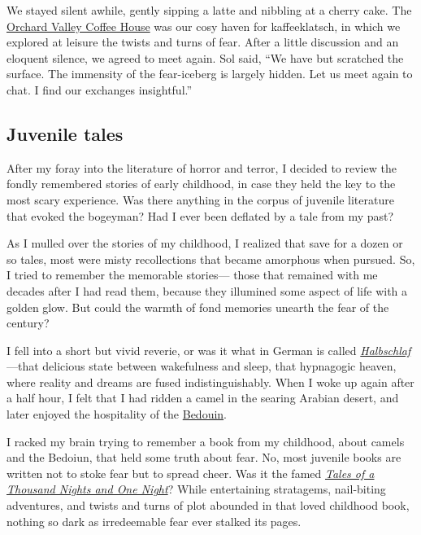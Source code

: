 \documentclass[
  a4paper,
]{article}
\begin{document}
We stayed silent awhile, gently sipping a latte and nibbling at a cherry
cake. The \href{http://www.orchardvalleycoffee.net/}{Orchard Valley
Coffee House} was our cosy haven for kaffeeklatsch, in which we explored
at leisure the twists and turns of fear. After a little discussion and
an eloquent silence, we agreed to meet again. Sol said, ``We have but
scratched the surface. The immensity of the fear-iceberg is largely
hidden. Let us meet again to chat. I find our exchanges insightful.''

\hypertarget{juvenile-tales}{%
\subsection{Juvenile tales}\label{juvenile-tales}}

After my foray into the literature of horror and terror, I decided to
review the fondly remembered stories of early childhood, in case they
held the key to the most scary experience. Was there anything in the
corpus of juvenile literature that evoked the bogeyman? Had I ever been
deflated by a tale from my past?

As I mulled over the stories of my childhood, I realized that save for a
dozen or so tales, most were misty recollections that became amorphous
when pursued. So, I tried to remember the memorable stories--- those
that remained with me decades after I had read them, because they
illumined some aspect of life with a golden glow. But could the warmth
of fond memories unearth the fear of the century?

I fell into a short but vivid reverie, or was it what in German is
called
\href{https://de.pons.com/\%C3\%BCbersetzung/deutsch-englisch/Halbschlaf}{\emph{Halbschlaf}}---that
delicious state between wakefulness and sleep, that hypnagogic heaven,
where reality and dreams are fused indistinguishably. When I woke up
again after a half hour, I felt that I had ridden a camel in the searing
Arabian desert, and later enjoyed the hospitality of the
\href{https://www.newworldencyclopedia.org/entry/Bedouin}{Bedouin}.

I racked my brain trying to remember a book from my childhood, about
camels and the Bedoiun, that held some truth about fear. No, most
juvenile books are written not to stoke fear but to spread cheer. Was it
the famed
\href{https://www.newworldencyclopedia.org/entry/The_Book_of_One_Thousand_and_One_Nights}{\emph{Tales
of a Thousand Nights and One Night}}? While entertaining stratagems,
nail-biting adventures, and twists and turns of plot abounded in that
loved childhood book, nothing so dark as irredeemable fear ever stalked
its pages.
\end{document}
